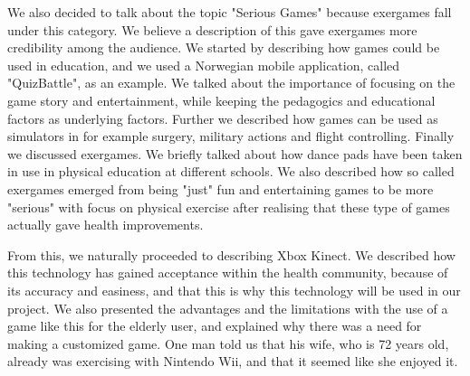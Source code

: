 We also decided to talk about the topic "Serious Games" because exergames fall under this category. We believe a description of this gave exergames more credibility among the audience. We started by describing how games could be used in education, and we used a Norwegian mobile application, called "QuizBattle", as an example. We talked about the importance of focusing on the game story and entertainment, while keeping the pedagogics and educational factors as underlying factors. Further we described how games can be used as simulators in for example surgery, military actions and flight controlling. Finally we discussed exergames. We briefly talked about how dance pads have been taken in use in physical education at different schools. We also described how so called exergames emerged from being "just" fun and entertaining games to be more "serious" with focus on physical exercise after realising that these type of games actually gave health improvements.

From this, we naturally proceeded to describing Xbox Kinect. We described how this technology has gained acceptance within the health community, because of its accuracy and easiness, and that this is why this technology will be used in our project. We also presented the advantages and the limitations with the use of a  game like this for the elderly user, and explained why there was a need for making a customized game. One man told us that his wife, who is 72 years old, already was exercising with Nintendo Wii, and that it seemed like she enjoyed it.

